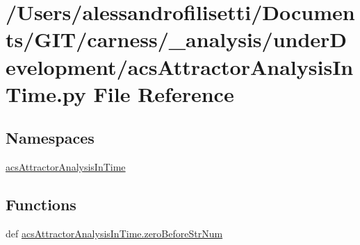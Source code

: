 \hypertarget{a00040}{\section{/\-Users/alessandrofilisetti/\-Documents/\-G\-I\-T/carness/\-\_\-analysis/under\-Development/acs\-Attractor\-Analysis\-In\-Time.py File Reference}
\label{a00040}
}
\subsection*{Namespaces}
\begin{DoxyCompactItemize}
\item 
\hyperlink{a00097}{acs\-Attractor\-Analysis\-In\-Time}
\end{DoxyCompactItemize}
\subsection*{Functions}
\begin{DoxyCompactItemize}
\item 
def \hyperlink{a00097_a52efd37e3719214b7a4c7c46842ae229}{acs\-Attractor\-Analysis\-In\-Time.\-zero\-Before\-Str\-Num}
\end{DoxyCompactItemize}
